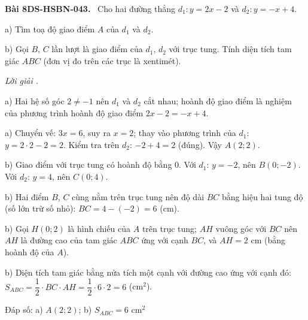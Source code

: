 \documentclass[12pt,a4paper]{article}
\newenvironment{problem}[1][]{\par\medskip\noindent\textbf{Bài #1.}\ }{\par}
\newenvironment{solution}[1][]{\par\noindent\textit{Lời giải #1.}\par}{\par}
\begin{document}
\begin{problem}[8DS-HSBN-043]
Cho hai đường thẳng $d_1\colon y = 2x - 2$ và $d_2\colon y = -x + 4$.

a) Tìm toạ độ giao điểm $A$ của $d_1$ và $d_2$.

b) Gọi $B$, $C$ lần lượt là giao điểm của $d_1$, $d_2$ với trục tung. Tính diện tích tam giác $ABC$ (đơn vị đo trên các trục là xentimét).

\begin{solution}
a) Hai hệ số góc $2 \neq -1$ nên $d_1$ và $d_2$ cắt nhau; hoành độ giao điểm là nghiệm của phương trình hoành độ giao điểm $2x - 2 = -x + 4$.

a) Chuyển vế: $3x = 6$, suy ra $x = 2$; thay vào phương trình của $d_1$: $y = 2 \cdot 2 - 2 = 2$. Kiểm tra trên $d_2$: $-2 + 4 = 2$ (đúng). Vậy $A(2; 2)$.

b) Giao điểm với trục tung có hoành độ bằng $0$. Với $d_1$: $y = -2$, nên $B(0; -2)$. Với $d_2$: $y = 4$, nên $C(0; 4)$.

b) Hai điểm $B$, $C$ cùng nằm trên trục tung nên độ dài $BC$ bằng hiệu hai tung độ (số lớn trừ số nhỏ): $BC = 4 - (-2) = 6$ (cm).

b) Gọi $H(0; 2)$ là hình chiếu của $A$ trên trục tung; $AH$ vuông góc với $BC$ nên $AH$ là đường cao của tam giác $ABC$ ứng với cạnh $BC$, và $AH = 2$ cm (bằng hoành độ của $A$).

b) Diện tích tam giác bằng nửa tích một cạnh với đường cao ứng với cạnh đó: $S_{ABC} = \dfrac{1}{2} \cdot BC \cdot AH = \dfrac{1}{2} \cdot 6 \cdot 2 = 6$ (cm$^2$).

Đáp số: a) $\boxed{A(2; 2)}$; b) $\boxed{S_{ABC} = 6 \text{ cm}^2}$
\end{solution}
\end{problem}
\end{document}
